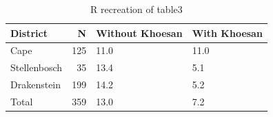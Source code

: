 \begin{table}

\caption{R recreation of table3}
\centering
\begin{tabular}[t]{lrll}
\toprule
District & N & Without Khoesan & With Khoesan\\
\midrule
Cape & 125 & 11.0 & 11.0\\
Stellenbosch & 35 & 13.4 & 5.1\\
Drakenstein & 199 & 14.2 & 5.2\\
Total & 359 & 13.0 & 7.2\\
\bottomrule
\end{tabular}
\end{table}
